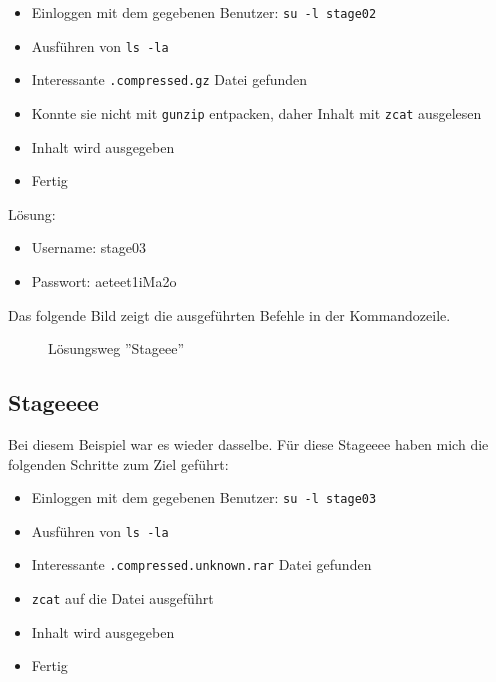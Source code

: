 \documentclass[12pt, a4paper, titlepage, oneside]{scrartcl}
\begin{document}
	\begin{itemize}
		\item Einloggen mit dem gegebenen Benutzer: \lstinline{su -l stage02}

		\item Ausführen von \lstinline{ls -la}

		\item Interessante \lstinline{.compressed.gz} Datei gefunden

		\item Konnte sie nicht mit \lstinline{gunzip} entpacken, daher Inhalt mit \lstinline{zcat}
			ausgelesen

		\item Inhalt wird ausgegeben

		\item Fertig
	\end{itemize}

	Lösung:
	\begin{itemize}
		\item Username: stage03

		\item Passwort: aeteet1iMa2o
	\end{itemize}

	Das folgende Bild zeigt die ausgeführten Befehle in der Kommandozeile.
	\begin{figure}[h!]
		\centering
		\caption{Lösungsweg ''Stageee''}
		\label{fig:stageee_solution}
	\end{figure}

	\newpage

	\subsection{Stageeee}
	Bei diesem Beispiel war es wieder dasselbe. Für diese Stageeee haben mich die
	folgenden Schritte zum Ziel geführt:

	\begin{itemize}
		\item Einloggen mit dem gegebenen Benutzer: \lstinline{su -l stage03}

		\item Ausführen von \lstinline{ls -la}

		\item Interessante \lstinline{.compressed.unknown.rar} Datei gefunden

		\item \lstinline{zcat} auf die Datei ausgeführt

		\item Inhalt wird ausgegeben

		\item Fertig
	\end{itemize}
\end{document}
